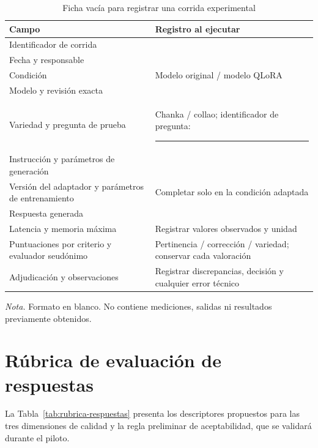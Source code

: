 \begin{table}[H]
\centering
\begin{threeparttable}
\caption{Ficha vacía para registrar una corrida experimental}
\label{tab:ficha-tecnica}
\small
\begin{tabularx}{\textwidth}{@{}P{4.0cm}L@{}}
\toprule
\textbf{Campo} & \textbf{Registro al ejecutar} \\
\midrule
Identificador de corrida & \rule{0pt}{2.4ex} \hfill \\
Fecha y responsable & \rule{0pt}{2.4ex} \hfill \\
Condición & Modelo original / modelo QLoRA \\
Modelo y revisión exacta & \rule{0pt}{2.4ex} \hfill \\
Variedad y pregunta de prueba & Chanka / collao; identificador de pregunta: \rule{2.4cm}{0.4pt} \\
Instrucción y parámetros de generación & \rule{0pt}{2.4ex} \hfill \\
Versión del adaptador y parámetros de entrenamiento & Completar solo en la condición adaptada \\
Respuesta generada & \rule{0pt}{2.4ex} \hfill \\
Latencia y memoria máxima & Registrar valores observados y unidad \\
Puntuaciones por criterio y evaluador seudónimo & Pertinencia / corrección / variedad; conservar cada valoración \\
Adjudicación y observaciones & Registrar discrepancias, decisión y cualquier error técnico \\
\bottomrule
\end{tabularx}
\begin{tablenotes}
\item \textit{Nota.} Formato en blanco. No contiene mediciones, salidas ni resultados previamente obtenidos.
\end{tablenotes}
\end{threeparttable}
\end{table}

\clearpage
\chapter{Rúbrica de evaluación de respuestas}
\label{anexo:revision_linguistica}

La Tabla~\ref{tab:rubrica-respuestas} presenta los descriptores propuestos para las tres dimensiones de calidad y la regla preliminar de aceptabilidad, que se validará durante el piloto.

